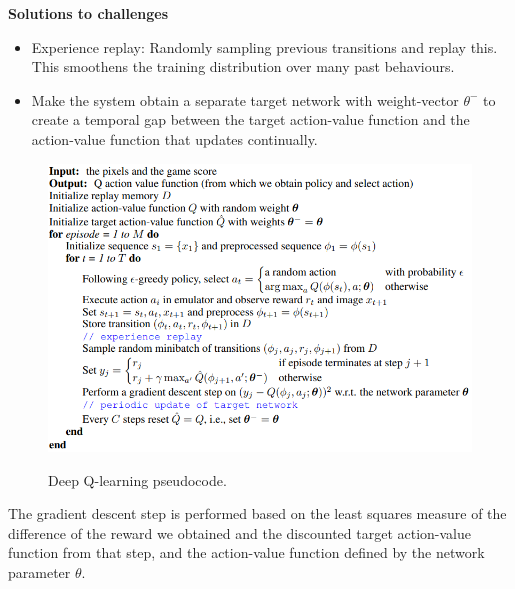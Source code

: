 \textbf{Solutions to challenges}

\begin{itemize}
    \item Experience replay: Randomly sampling previous transitions and replay this. This smoothens the training distribution over many past behaviours.
    \item Make the system obtain a separate target network with weight-vector $\theta^-$ to create a temporal gap between the target action-value function and the action-value function that updates continually.
\end{itemize}

\begin{figure}[h]
    \centering
        \includegraphics[width=\textwidth]{figures/DRL/dqn.PNG}\\
        \caption{Deep Q-learning pseudocode.}
\end{figure}

The gradient descent step is performed based on the least squares measure of the difference of the reward we obtained and the discounted target action-value function from that step, and the action-value function defined by the network parameter $\theta$.